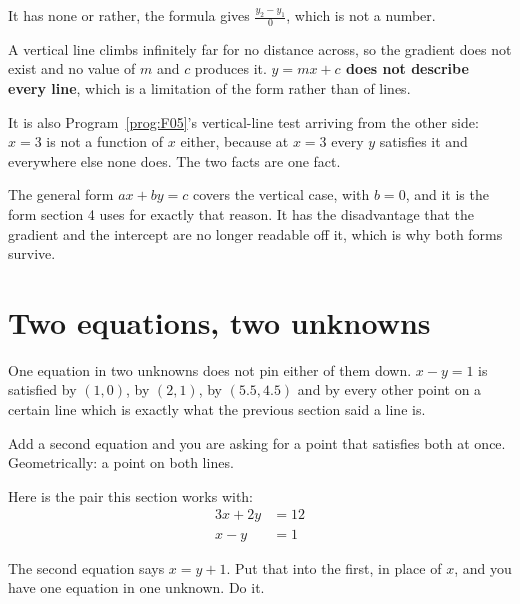 \begin{fr}
\begin{ansblock}
It has none \dash{} or rather, the formula gives $\frac{y_2 - y_1}{0}$, which
is not a number.
\end{ansblock}

A vertical line climbs infinitely far for no distance across, so the gradient
does not exist and no value of $m$ and $c$ produces it. \textbf{$y = mx + c$
does not describe every line}, which is a limitation of the form rather than
of lines.

It is also Program~\ref{prog:F05}'s vertical-line test arriving from the other
side: $x = 3$ is not a function of $x$ either, because at $x = 3$ every $y$
satisfies it and everywhere else none does. The two facts are one fact.

\begin{note}
The general form $ax + by = c$ covers the vertical case, with $b = 0$, and it
is the form section 4 uses for exactly that reason. It has the disadvantage
that the gradient and the intercept are no longer readable off it, which is
why both forms survive.
\end{note}
\end{fr}

\section{Two equations, two unknowns}
\label{sec:F06-simultaneous}

\begin{fr}
One equation in two unknowns does not pin either of them down. $x - y = 1$ is
satisfied by $(1, 0)$, by $(2, 1)$, by $(\num{5.5}, \num{4.5})$ and by every
other point on a certain line \dash{} which is exactly what the previous
section said a line is.

Add a second equation and you are asking for a point that satisfies both at
once. Geometrically: a point on both lines.

Here is the pair this section works with:
\begin{align*}
3x + 2y &= 12 \\
x - y &= 1
\end{align*}

The second equation says $x = y + 1$. Put that into the first, in place of
$x$, and you have one equation in one unknown. Do it.
\nextframe
\end{fr}

